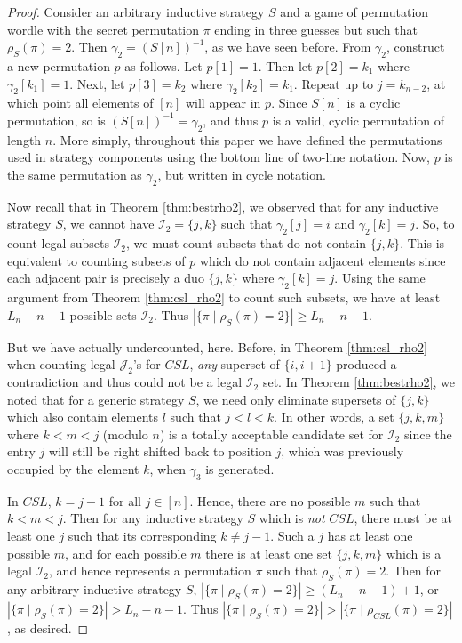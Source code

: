 \documentclass[article]{amsart}
\theoremstyle{definition}
\theoremstyle{definition}
\theoremstyle{remark}
\DeclarePairedDelimiter\floor{\lfloor}{\rfloor}
\begin{document}
\begin{proof}
Consider an arbitrary inductive strategy $S$ and a game of permutation wordle with the secret permutation $\pi$ ending in three guesses but such that $\rho_S(\pi) = 2$. Then $\gamma_2 = (S[n])^{-1}$, as we have seen before. From $\gamma_2$, construct a new permutation $p$ as follows. Let $p[1] = 1$. Then let $p[2] = k_1$ where $\gamma_2[k_1] = 1$. Next, let $p[3] = k_2$ where $\gamma_2[k_2] = k_1$. Repeat up to $j = k_{n-2}$, at which point all elements of $[n]$ will appear in $p$. Since $S[n]$ is a cyclic permutation, so is $(S[n])^{-1} = \gamma_2$, and thus $p$ is a valid, cyclic permutation of length $n$. More simply, throughout this paper we have defined the permutations used in strategy components using the bottom line of two-line notation. Now, $p$ is the same permutation as $\gamma_2$, but written in cycle notation.

Now recall that in Theorem \ref{thm:bestrho2}, we observed that for any inductive strategy $S$, we cannot have $\mathcal{I}_2 = \{j,k\}$ such that $\gamma_2[j] = i$ and $\gamma_2[k] = j$. So, to count legal subsets $\mathcal{I}_2$, we must count subsets that do not contain $\{j,k\}$. This is equivalent to counting subsets of $p$ which do not contain adjacent elements since each adjacent pair is precisely a duo $\{j,k\}$ where $\gamma_2[k] = j$. Using the same argument from Theorem \ref{thm:csl_rho2} to count such subsets, we have at least $L_n - n - 1$ possible sets $\mathcal{I}_2$. Thus $|\{ \pi \mid \rho_{S}(\pi) = 2\}| \geq L_n - n - 1$. 

But we have actually undercounted, here. Before, in Theorem \ref{thm:csl_rho2} when counting legal $\mathcal{J}_2$'s for $CSL$, \textit{any} superset of $\{i,i+1\}$ produced a contradiction and thus could not be a legal $\mathcal{I}_2$ set. In Theorem \ref{thm:bestrho2}, we noted that for a generic strategy $S$, we need only eliminate supersets of $\{j,k\}$ which also contain elements $l$ such that $j < l < k$. In other words, a set $\{j,k,m\}$ where $k < m < j$ (modulo $n$) is a totally acceptable candidate set for $\mathcal{I}_2$ since the entry $j$ will still be right shifted back to position $j$, which was previously occupied by the element $k$, when $\gamma_3$ is generated. 

In $CSL$, $k = j-1$ for all $j \in [n]$. Hence, there are no possible $m$ such that $k < m < j$. Then for any inductive strategy $S$ which is \textit{not} $CSL$, there must be at least one $j$ such that its corresponding $k \neq j-1$. Such a $j$ has at least one possible $m$, and for each possible $m$ there is at least one set $\{j,k,m\}$ which is a legal $\mathcal{I}_2$, and hence represents a permutation $\pi$ such that $\rho_S(\pi) = 2$. Then for any arbitrary inductive strategy $S$, $|\{ \pi \mid \rho_{S}(\pi) = 2\}| \geq (L_n - n - 1) + 1$, or $|\{ \pi \mid \rho_{S}(\pi) = 2\}| > L_n - n - 1$. Thus $|\{ \pi \mid \rho_{S}(\pi) = 2\}| > |\{ \pi \mid \rho_{CSL}(\pi) = 2\}|$, as desired.

    
\end{proof}
\end{document}
